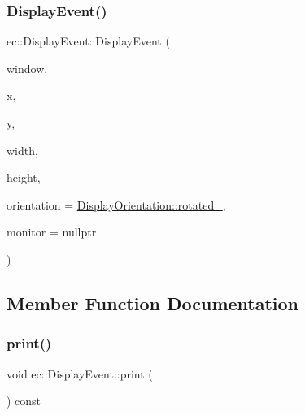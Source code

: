 \mbox{\label{structec_1_1_display_event_aa3ba57a1a866569e66bf13aa77d06bee}} 
\subsubsection{\texorpdfstring{Display\+Event()}{DisplayEvent()}\hspace{0.1cm}{\footnotesize\ttfamily [2/2]}}
{\footnotesize\ttfamily ec\+::\+Display\+Event\+::\+Display\+Event (\begin{DoxyParamCaption}\item[{G\+L\+F\+Wwindow $\ast$}]{window,  }\item[{int}]{x,  }\item[{int}]{y,  }\item[{int}]{width,  }\item[{int}]{height,  }\item[{Display\+Orientation}]{orientation = {\ttfamily \mbox{\hyperlink{_input_event_8h_a69ce17c829030355847d745e3ca3b9f3}{Display\+Orientation\+::rotated\+\_}}},  }\item[{G\+L\+F\+Wmonitor $\ast$}]{monitor = {\ttfamily nullptr} }\end{DoxyParamCaption})\hspace{0.3cm}{\ttfamily [explicit]}}



\subsection{Member Function Documentation}
\mbox{\label{structec_1_1_display_event_a5e6bc91b25bc5fe6ffa8197f2fed32c2}} 
\subsubsection{\texorpdfstring{print()}{print()}}
{\footnotesize\ttfamily void ec\+::\+Display\+Event\+::print (\begin{DoxyParamCaption}{ }\end{DoxyParamCaption}) const}



